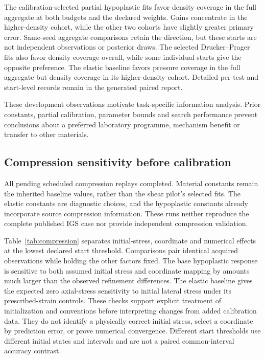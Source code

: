 \documentclass[11pt,a4paper]{article}
\newcommand{\CompressionReplayCount}{pending}
\begin{document}
The calibration-selected partial hypoplastic fits favor density coverage in the full aggregate at both budgets and the declared weights. Gains concentrate in the higher-density cohort, while the other two cohorts have slightly greater primary error. Same-seed aggregate comparisons retain the direction, but these starts are not independent observations or posterior draws. The selected Drucker--Prager fits also favor density coverage overall, while some individual starts give the opposite preference. The elastic baseline favors pressure coverage in the full aggregate but density coverage in its higher-density cohort. Detailed per-test and start-level records remain in the generated paired report.

These development observations motivate task-specific information analysis. Prior constants, partial calibration, parameter bounds and search performance prevent conclusions about a preferred laboratory programme, mechanism benefit or transfer to other materials.

\subsection{Compression sensitivity before calibration}
All \CompressionReplayCount{} scheduled compression replays completed. Material constants remain the inherited baseline values, rather than the shear pilot's selected fits. The elastic constants are diagnostic choices, and the hypoplastic constants already incorporate source compression information. These runs neither reproduce the complete published IGS case nor provide independent compression validation.

Table~\ref{tab:compression} separates initial-stress, coordinate and numerical effects at the lowest declared start threshold. Comparisons pair identical acquired observations while holding the other factors fixed. The base hypoplastic response is sensitive to both assumed initial stress and coordinate mapping by amounts much larger than the observed refinement differences. The elastic baseline gives the expected zero axial-stress sensitivity to initial lateral stress under its prescribed-strain controls. These checks support explicit treatment of initialization and conventions before interpreting changes from added calibration data. They do not identify a physically correct initial stress, select a coordinate by prediction error, or prove numerical convergence. Different start thresholds use different initial states and intervals and are not a paired common-interval accuracy contrast.
\end{document}
